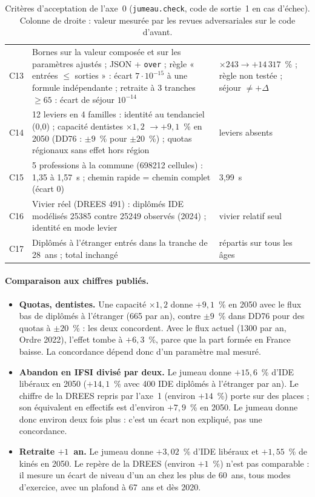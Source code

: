 \begin{table}[h]
\begin{tabular}{lp{6.3cm}p{5.0cm}}
C13 & Bornes sur la valeur composée et sur les paramètres ajustés ; JSON + \texttt{over} ;
règle « entrées $\le$ sorties » : écart $7\cdot10^{-15}$\mesure{} à une formule indépendante ;
retraite à 3 tranches $\ge 65$ : écart de séjour $10^{-14}$\mesure{} & $\times243 \to +14\,317$~\% ;
règle non testée ; séjour $\ne +\Delta$ \\
C14 & 12 leviers en 4 familles : identité au tendanciel (0,0) ; capacité dentistes $\times1{,}2$
$\to +9{,}1$\mesure{}~\% en 2050 (DD76 : $\pm9$~\% pour $\pm20$~\%) ; quotas régionaux sans effet hors
région & leviers absents \\
C15 & 5 professions à la commune (\num{698212} cellules) : 1,35 à 1,57\mesure{}~s ; chemin rapide
= chemin complet (écart 0) & 3,99\mesure{}~s \\
C16 & Vivier réel (DREES 491) : diplômés IDE modélisés \num{25385} contre \num{25249} observés
(2024) ; identité en mode levier & vivier relatif seul \\
C17 & Diplômés à l'étranger entrés dans la tranche de 28~ans ; total inchangé & répartis sur tous
les âges \\
\bottomrule
\end{tabular}
\caption{Critères d'acceptation de l'axe~0 (\texttt{jumeau.check}, code de sortie~1 en cas
d'échec). Colonne de droite : valeur mesurée par les revues adversariales sur le code d'avant.}
\label{a0-tab:criteres}
\end{table}

\paragraph{Comparaison aux chiffres publiés.}
\begin{itemize}
  \item \textbf{Quotas, dentistes.} Une capacité $\times1{,}2$ donne $+9{,}1$\mesure{}~\% en 2050 avec le
        flux bas de diplômés à l'étranger (665 par an), contre $\pm9$~\% dans DD76 pour des quotas à
        $\pm20$~\% \citep{a0-drees2021dd76} : les deux concordent. Avec le flux actuel (\num{1300} par an,
        Ordre 2022), l'effet tombe à $+6{,}3$\mesure{}~\%, parce que la part formée en France baisse.
        La concordance dépend donc d'un paramètre mal mesuré.
  \item \textbf{Abandon en IFSI divisé par deux.} Le jumeau donne $+15{,}6$\mesure{}~\% d'IDE libéraux
        en 2050 ($+14{,}1$\mesure{}~\% avec 400 IDE diplômés à l'étranger par an). Le chiffre de la DREES repris par l'axe~1 (environ $+14$~\%) porte sur des places ;
        son équivalent en effectifs est d'environ $+7{,}9$~\% en 2050. Le jumeau donne donc environ deux
        fois plus : c'est un écart non expliqué, pas une concordance.
  \item \textbf{Retraite $+1$~an.} Le jumeau donne $+3{,}02$\mesure{}~\% d'IDE libéraux et
        $+1{,}55$\mesure{}~\% de kinés en 2050. Le repère de la DREES (environ $+1$~\%) n'est pas
        comparable : il mesure un écart de niveau d'un an chez les plus de 60~ans, tous modes
        d'exercice, avec un plafond à 67~ans et dès 2020.
\end{itemize}

